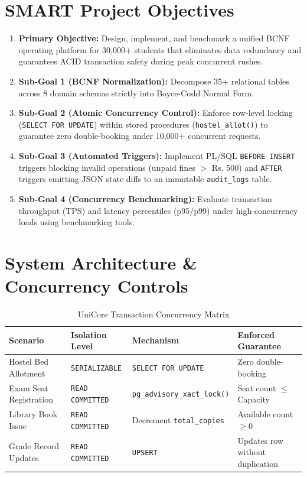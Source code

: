 \documentclass[11pt,a4paper]{article}
\begin{document}
\section{SMART Project Objectives}
\begin{enumerate}[leftmargin=*]
    \item \textbf{Primary Objective:} Design, implement, and benchmark a unified BCNF operating platform for 30,000+ students that eliminates data redundancy and guarantees ACID transaction safety during peak concurrent rushes.
    \item \textbf{Sub-Goal 1 (BCNF Normalization):} Decompose 35+ relational tables across 8 domain schemas strictly into Boyce-Codd Normal Form.
    \item \textbf{Sub-Goal 2 (Atomic Concurrency Control):} Enforce row-level locking (\texttt{SELECT FOR UPDATE}) within stored procedures (\texttt{hostel\_allot()}) to guarantee zero double-booking under 10,000+ concurrent requests.
    \item \textbf{Sub-Goal 3 (Automated Triggers):} Implement PL/SQL \texttt{BEFORE INSERT} triggers blocking invalid operations (unpaid fines $>$ Rs. 500) and \texttt{AFTER} triggers emitting JSON state diffs to an immutable \texttt{audit\_logs} table.
    \item \textbf{Sub-Goal 4 (Concurrency Benchmarking):} Evaluate transaction throughput (TPS) and latency percentiles (p95/p99) under high-concurrency loads using benchmarking tools.
\end{enumerate}

\section{System Architecture \& Concurrency Controls}
\begin{table}[h!]
\centering
\begin{tabular}{llll}
\toprule
\textbf{Scenario} & \textbf{Isolation Level} & \textbf{Mechanism} & \textbf{Enforced Guarantee} \\
\midrule
Hostel Bed Allotment & \texttt{SERIALIZABLE} & \texttt{SELECT FOR UPDATE} & Zero double-booking \\
Exam Seat Registration & \texttt{READ COMMITTED} & \texttt{pg\_advisory\_xact\_lock()} & Seat count $\le$ Capacity \\
Library Book Issue & \texttt{READ COMMITTED} & Decrement \texttt{total\_copies} & Available count $\ge 0$ \\
Grade Record Updates & \texttt{READ COMMITTED} & \texttt{UPSERT} & Updates row without duplication \\
\bottomrule
\end{tabular}
\caption{UniCore Transaction Concurrency Matrix}
\end{table}
\end{document}
